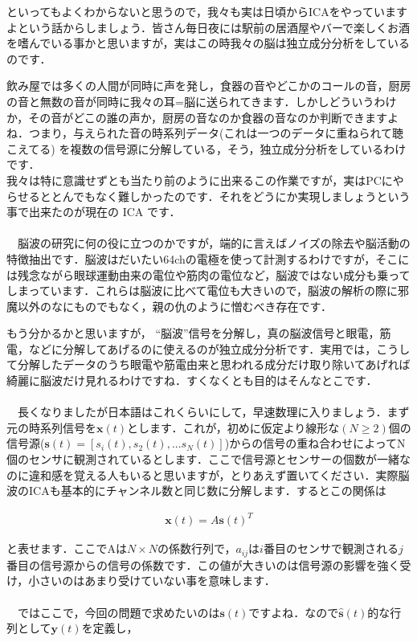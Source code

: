 \documentclass[11pt,a4paper,uplatex]{ujreport}
\begin{document}
といってもよくわからないと思うので，我々も実は日頃からICAをやっていますよという話からしましょう．皆さん毎日夜には駅前の居酒屋やバーで楽しくお酒を嗜んでいる事かと思いますが，実はこの時我々の脳は独立成分分析をしているのです．

飲み屋では多くの人間が同時に声を発し，食器の音やどこかのコールの音，厨房の音と無数の音が同時に我々の耳=脳に送られてきます．しかしどういうわけか，その音がどこの誰の声か，厨房の音なのか食器の音なのか判断できますよね．つまり，与えられた音の時系列データ(これは一つのデータに重ねられて聴こえてる) を複数の信号源に分解している，そう，独立成分分析をしているわけです．\\

我々は特に意識せずとも当たり前のように出来るこの作業ですが，実はPCにやらせるととんでもなく難しかったのです．それをどうにか実現しましょうという事で出来たのが現在の ICA です．\\
\\
　脳波の研究に何の役に立つのかですが，端的に言えばノイズの除去や脳活動の特徴抽出です．脳波はだいたい64chの電極を使って計測するわけですが，そこには残念ながら眼球運動由来の電位や筋肉の電位など，脳波ではない成分も乗ってしまっています．これらは脳波に比べて電位も大きいので，脳波の解析の際に邪魔以外のなにものでもなく，親の仇のように憎むべき存在です．

もう分かるかと思いますが， ``脳波''信号を分解し，真の脳波信号と眼電，筋電，などに分解してあげるのに使えるのが独立成分分析です．実用では，こうして分解したデータのうち眼電や筋電由来と思われる成分だけ取り除いてあげれば綺麗に脳波だけ見れるわけですね．すくなくとも目的はそんなとこです．\\
\\
　長くなりましたが日本語はこれくらいにして，早速数理に入りましょう．まず元の時系列信号を$\mathbf{x}(t)$とします．これが，初めに仮定より線形な$(N \geq 2)$個の信号源($\mathbf{s}(t)=[s_i(t), s_2(t),...s_N(t)]$)からの信号の重ね合わせによってN個のセンサに観測されているとします．ここで信号源とセンサーの個数が一緒なのに違和感を覚える人もいると思いますが，とりあえず置いてください．実際脳波のICAも基本的にチャンネル数と同じ数に分解します．するとこの関係は

\begin{eqnarray}
\mathbf{x}(t) = A \mathbf{s}(t)^T
\end{eqnarray}

と表せます．ここでAは$N\times N$の係数行列で，$a_{ij}$は$i$番目のセンサで観測される$j$番目の信号源からの信号の係数です．この値が大きいのは信号源の影響を強く受け，小さいのはあまり受けていない事を意味します．\\
\\
　ではここで，今回の問題で求めたいのは$\mathbf{s}(t)$ですよね．なので$\hat{\mathbf{s}}(t)$的な行列として$\mathbf{y}(t)$を定義し，
\end{document}
